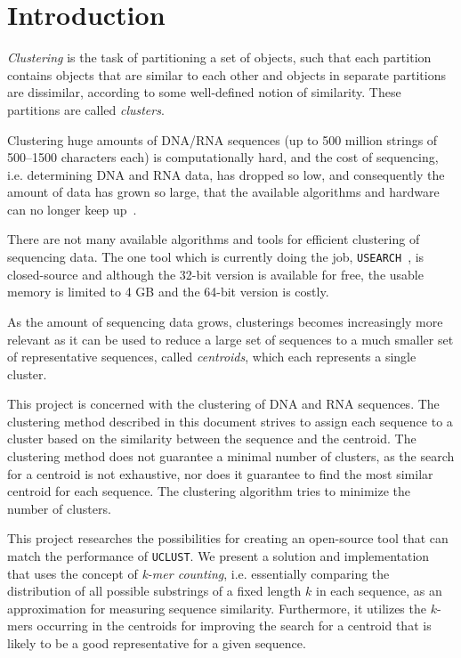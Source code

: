 \section{Introduction}
\label{sec:introduction}

\emph{Clustering} is the task of partitioning a set of objects, such that each
partition contains objects that are similar to each other and objects in
separate partitions are dissimilar, according to some well-defined notion of
similarity. These partitions are called \emph{clusters}.

Clustering huge amounts of DNA/RNA sequences (up to \num{500} million strings of
\num{500}--\num{1500} characters each) is computationally hard, and the cost of sequencing,
i.e. determining DNA and RNA data, has dropped so low, and consequently the
amount of data has grown so large, that the available algorithms and hardware
can no longer keep up~\cite{rothberg}.

There are not many available algorithms and tools for efficient clustering of
sequencing data. The one tool which is currently doing the job,
\texttt{USEARCH}~\cite{edgar,usearch}, is closed-source and although the \num{32}-bit
version is available for free, the usable memory is limited to \num{4} GB and the
\num{64}-bit version is costly.

As the amount of sequencing data grows, clusterings becomes increasingly more
relevant as it can be used to reduce a large set of sequences to a much smaller
set of representative sequences, called \emph{centroids}, which each represents
a single cluster.

This project is concerned with the clustering of DNA and RNA sequences. The
clustering method described in this document strives to assign each sequence to
a cluster based on the similarity between the sequence and the centroid. The
clustering method does not guarantee a minimal number of clusters, as the
search for a centroid is not exhaustive, nor does it guarantee to find the most
similar centroid for each sequence. The clustering algorithm tries to minimize
the number of clusters.

This project researches the possibilities for creating an open-source tool that
can match the performance of \texttt{UCLUST}. We present a solution and
implementation that uses the concept of \emph{k-mer counting}, i.e. essentially
comparing the distribution of all possible substrings of a fixed length $k$ in
each sequence, as an approximation for measuring sequence similarity.
Furthermore, it utilizes the $k$-mers occurring in the centroids for improving
the search for a centroid that is likely to be a good representative for a
given sequence.

